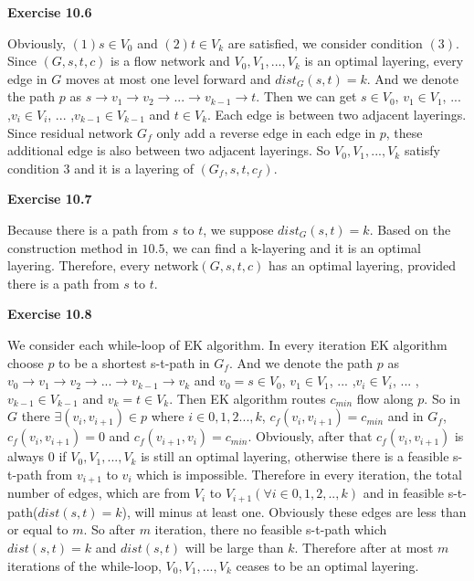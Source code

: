 \documentclass{article} %
\begin{document}
	
	\textbf{Exercise 10.6}\par
	Obviously, $(1)s\in V_{0}$ and $(2)t\in V_{k}$ are satisfied, we consider condition $(3)$. Since $(G,s,t,c)$ is a flow network
	and $V_{0},V_{1},...,V_{k}$ is an optimal layering, every edge in $G$ moves at most one level forward and $dist_G(s,t)=k$. And we denote the path $p$
	as $s\rightarrow v_{1}\rightarrow v_{2} \rightarrow ...\rightarrow v_{k-1} \rightarrow t $. Then we can get  $s\in V_{0}$, $v_{1}\in V_{1}$, ... ,$v_{i}\in V_{i}$, ... ,$v_{k-1}\in V_{k-1}$ and $t\in V_{k}$. Each edge is between two adjacent layerings. Since residual network $G_{f}$ only add a reverse edge in each edge in $p$, these additional edge is also between two adjacent layerings. So $V_{0},V_{1},...,V_{k}$ satisfy condition $3$ and it is a layering of $(G_{f},s,t,c_{f})$.\par

    \textbf{Exercise 10.7}\par
    Because there is a path from $s$ to $t$, we suppose $dist_G(s,t)=k$. Based on the construction method in $10.5$, we can find a k-layering and it is an optimal layering. Therefore, every network$(G,s,t,c)$ has an optimal layering, provided there is a path from $s$ to $t$.
	
	\textbf{Exercise 10.8}\par
	We consider each while-loop of EK algorithm. In every iteration  EK algorithm choose $p$ to be a shortest s-t-path in $G_{f}$.
	And we denote the path $p$ as $v_{0}\rightarrow v_{1}\rightarrow v_{2} \rightarrow ...\rightarrow v_{k-1} \rightarrow v_{k} $ and $v_{0}=s\in V_{0}$, $v_{1}\in V_{1}$, ... ,$v_{i}\in V_{i}$, ... ,$v_{k-1}\in V_{k-1}$ and $v_{k}=t\in V_{k}$. Then EK algorithm routes $c_{min}$ flow along $p$. So in $G$ there $\exists (v_{i},v_{i+1})\in p$ where $i\in {0,1,2...,k}$, $c_{f}(v_{i},v_{i+1})=c_{min}$ and in $G_{f}$, $c_{f}(v_{i},v_{i+1})=0$ and  $c_{f}(v_{i+1},v_{i})=c_{min}$. Obviously, after that $c_{f}(v_{i},v_{i+1})$ is always $0$ if  $V_{0},V_{1},...,V_{k}$ is still an optimal layering, otherwise there is a feasible s-t-path from $v_{i+1}$ to $v_{i}$ which is impossible. Therefore in every iteration, the total number of edges, which are from $V_{i}$ to $V_{i+1} (\forall i \in{0,1,2,..,k})$ and in feasible s-t-path($dist(s,t)=k$), will minus at least one. Obviously these edges are less than or equal to $m$. So after $m$ iteration, there no feasible s-t-path which $dist(s,t)=k$ and $dist(s,t)$ will be large than $k$. Therefore after at most $m$ iterations of  the while-loop, $V_{0},V_{1},...,V_{k}$ ceases to be an optimal layering.\par
	
\end{document}
